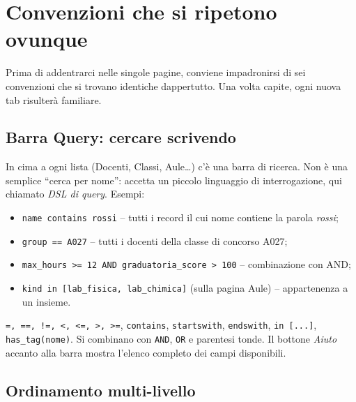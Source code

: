 
\section{Convenzioni che si ripetono ovunque}
\label{sec:convenzioni_ui}

Prima di addentrarci nelle singole pagine, conviene impadronirsi
di sei convenzioni che si trovano identiche dappertutto. Una
volta capite, ogni nuova tab risulter\`a familiare.

\subsection{Barra Query: cercare scrivendo}

In cima a ogni lista (Docenti, Classi, Aule\dots) c'\`e una
barra di ricerca. Non \`e una semplice ``cerca per nome'': accetta
un piccolo linguaggio di interrogazione, qui chiamato \emph{DSL
di query}. Esempi:

\begin{itemize}
\item \texttt{name contains rossi} -- tutti i record il cui
  nome contiene la parola \emph{rossi};
\item \texttt{group == A027} -- tutti i docenti della classe di
  concorso A027;
\item \texttt{max\_hours >= 12 AND graduatoria\_score > 100}
  -- combinazione con AND;
\item \texttt{kind in [lab\_fisica, lab\_chimica]} (sulla pagina
  Aule) -- appartenenza a un insieme.
\end{itemize}

\begin{esempiobox}[title=Operatori riconosciuti]
\texttt{=, ==, !=, <, <=, >, >=}, \texttt{contains},
\texttt{startswith}, \texttt{endswith}, \texttt{in [...]},
\texttt{has\_tag(nome)}. Si combinano con \texttt{AND}, \texttt{OR}
e parentesi tonde. Il bottone \emph{Aiuto} accanto alla barra
mostra l'elenco completo dei campi disponibili.
\end{esempiobox}

\subsection{Ordinamento multi-livello}

